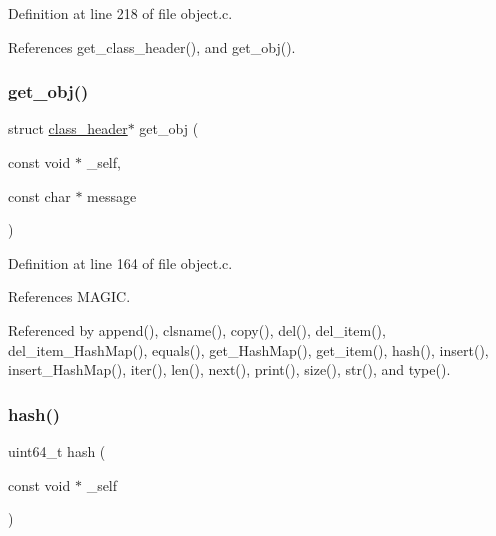 Definition at line 218 of file object.\+c.



References get\+\_\+class\+\_\+header(), and get\+\_\+obj().

\mbox{\label{group__collection_gaaad95663edf19fd4b734bd9977976169}} 
\subsubsection{\texorpdfstring{get\+\_\+obj()}{get\_obj()}}
{\footnotesize\ttfamily struct \mbox{\hyperlink{structclass__header}{class\+\_\+header}}$\ast$ get\+\_\+obj (\begin{DoxyParamCaption}\item[{const void $\ast$}]{\+\_\+self,  }\item[{const char $\ast$}]{message }\end{DoxyParamCaption})\hspace{0.3cm}{\ttfamily [inline]}}



Definition at line 164 of file object.\+c.



References M\+A\+G\+IC.



Referenced by append(), clsname(), copy(), del(), del\+\_\+item(), del\+\_\+item\+\_\+\+Hash\+Map(), equals(), get\+\_\+\+Hash\+Map(), get\+\_\+item(), hash(), insert(), insert\+\_\+\+Hash\+Map(), iter(), len(), next(), print(), size(), str(), and type().

\mbox{\label{group__collection_gae0b3682e6ff5038e94c9e551bdd0d489}} 
\subsubsection{\texorpdfstring{hash()}{hash()}}
{\footnotesize\ttfamily uint64\+\_\+t hash (\begin{DoxyParamCaption}\item[{const void $\ast$}]{\+\_\+self }\end{DoxyParamCaption})}



